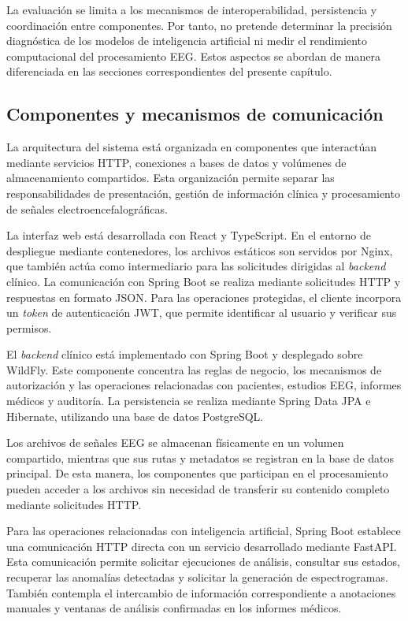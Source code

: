 La evaluación se limita a los mecanismos de interoperabilidad, persistencia y coordinación entre componentes. Por tanto, no pretende determinar la precisión diagnóstica de los modelos de inteligencia artificial ni medir el rendimiento computacional del procesamiento EEG. Estos aspectos se abordan de manera diferenciada en las secciones correspondientes del presente capítulo.


\subsection{Componentes y mecanismos de comunicación}

\label{subsec:componentes_integracion}

La arquitectura del sistema está organizada en componentes que interactúan mediante servicios HTTP, conexiones a bases de datos y volúmenes de almacenamiento compartidos. Esta organización permite separar las responsabilidades de presentación, gestión de información clínica y procesamiento de señales electroencefalográficas.


La interfaz web está desarrollada con React y TypeScript. En el entorno de despliegue mediante contenedores, los archivos estáticos son servidos por Nginx, que también actúa como intermediario para las solicitudes dirigidas al \textit{backend} clínico. La comunicación con Spring Boot se realiza mediante solicitudes HTTP y respuestas en formato JSON. Para las operaciones protegidas, el cliente incorpora un \textit{token} de autenticación JWT, que permite identificar al usuario y verificar sus permisos.


El \textit{backend} clínico está implementado con Spring Boot y desplegado sobre WildFly. Este componente concentra las reglas de negocio, los mecanismos de autorización y las operaciones relacionadas con pacientes, estudios EEG, informes médicos y auditoría. La persistencia se realiza mediante Spring Data JPA e Hibernate, utilizando una base de datos PostgreSQL.

Los archivos de señales EEG se almacenan físicamente en un volumen compartido, mientras que sus rutas y metadatos se registran en la base de datos principal. De esta manera, los componentes que participan en el procesamiento pueden acceder a los archivos sin necesidad de transferir su contenido completo mediante solicitudes HTTP.

Para las operaciones relacionadas con inteligencia artificial, Spring Boot establece una comunicación HTTP directa con un servicio desarrollado mediante FastAPI. Esta comunicación permite solicitar ejecuciones de análisis, consultar sus estados, recuperar las anomalías detectadas y solicitar la generación de espectrogramas. También contempla el intercambio de información correspondiente a anotaciones manuales y ventanas de análisis confirmadas en los informes médicos.

